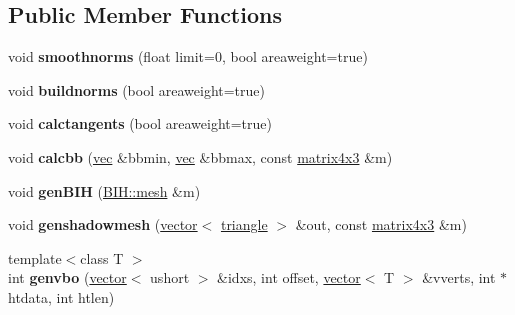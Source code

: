 \subsection*{Public Member Functions}
\begin{DoxyCompactItemize}
\item 
\mbox{\label{structvertmodel_1_1vertmesh_a5adfd42d1ce8aa35a40b05b600e814b8}} 
void {\bfseries smoothnorms} (float limit=0, bool areaweight=true)
\item 
\mbox{\label{structvertmodel_1_1vertmesh_ac8865a176d9daf598727737bbfc1001a}} 
void {\bfseries buildnorms} (bool areaweight=true)
\item 
\mbox{\label{structvertmodel_1_1vertmesh_a938de2e644e373ce543c6157f6b79cce}} 
void {\bfseries calctangents} (bool areaweight=true)
\item 
\mbox{\label{structvertmodel_1_1vertmesh_a7a85bd3b8076e65471cfb6e66fa6108e}} 
void {\bfseries calcbb} (\hyperlink{structvec}{vec} \&bbmin, \hyperlink{structvec}{vec} \&bbmax, const \hyperlink{structmatrix4x3}{matrix4x3} \&m)
\item 
\mbox{\label{structvertmodel_1_1vertmesh_a8c9a4dc7c75725ca63e01d8846e6f44c}} 
void {\bfseries gen\+B\+IH} (\hyperlink{struct_b_i_h_1_1mesh}{B\+I\+H\+::mesh} \&m)
\item 
\mbox{\label{structvertmodel_1_1vertmesh_abbeaa0e99108532b8b4b5b5f440716d0}} 
void {\bfseries genshadowmesh} (\hyperlink{structvector}{vector}$<$ \hyperlink{structtriangle}{triangle} $>$ \&out, const \hyperlink{structmatrix4x3}{matrix4x3} \&m)
\item 
\mbox{\label{structvertmodel_1_1vertmesh_afe9fb1804bd1bd9a15f5ca7c99a2e731}} 
{\footnotesize template$<$class T $>$ }\\int {\bfseries genvbo} (\hyperlink{structvector}{vector}$<$ ushort $>$ \&idxs, int offset, \hyperlink{structvector}{vector}$<$ T $>$ \&vverts, int $\ast$htdata, int htlen)
\item 
\mbox{\label{structvertmodel_1_1vertmesh_ad1fb4fb1f3b196fd38e77054b18ea68f}} 

\end{DoxyCompactItemize}
